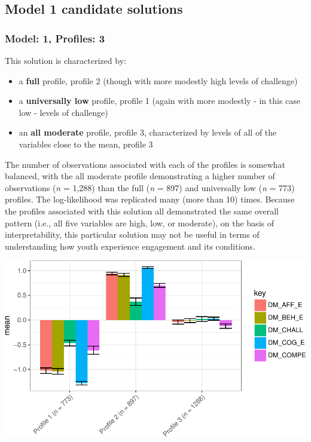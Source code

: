 \documentclass[]{msu-thesis}
\providecommand{\tightlist}{%
  \setlength{\itemsep}{0pt}\setlength{\parskip}{0pt}}
\theoremstyle{definition}
\theoremstyle{definition}
\theoremstyle{definition}
\theoremstyle{remark}
\begin{document}
\subsection{Model 1 candidate
solutions}\label{model-1-candidate-solutions}

\subsubsection{Model: 1, Profiles: 3}\label{model-1-profiles-3}

This solution is characterized by:

\begin{itemize}
\tightlist
\item
  a \textbf{full} profile, profile 2 (though with more modestly high
  levels of challenge)
\item
  a \textbf{universally low} profile, profile 1 (again with more
  modestly - in this case low - levels of challenge)
\item
  an \textbf{all moderate} profile, profile 3, characterized by levels
  of all of the variables close to the mean, profile 3
\end{itemize}

The number of observations associated with each of the profiles is
somewhat balanced, with the all moderate profile demonstrating a higher
number of observations (\emph{n} = 1,288) than the full (\emph{n} = 897)
and universally low (\emph{n} = 773) profiles. The log-likelihood was
replicated many (more than 10) times. Because the profiles associated
with this solution all demonstrated the same overall pattern (i.e., all
five variables are high, low, or moderate), on the basis of
interpretability, this particular solution may not be useful in terms of
understanding how youth experience engagement and its conditions.

\begin{center}\includegraphics[width=0.8\linewidth]{rosenberg-dissertation_files/figure-latex/m1_3p-1} \end{center}
\end{document}
